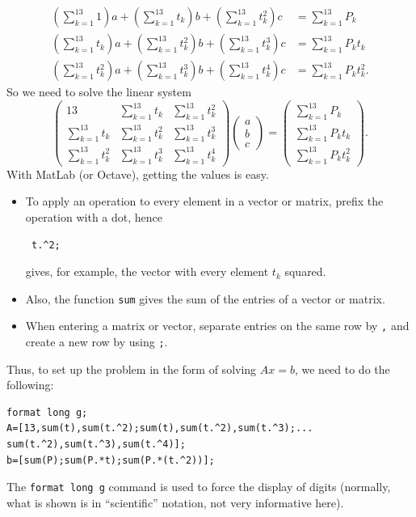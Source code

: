 \begin{align*}
\left(\sum_{k=1}^{13}1\right)a+\left(\sum_{k=1}^{13}t_k\right)b+\left(\sum_{k=1}^{13}t_k^2\right)c &= \sum_{k=1}^{13}P_k \\
\left(\sum_{k=1}^{13}t_k\right)a+\left(\sum_{k=1}^{13}t_k^2\right)b+\left(\sum_{k=1}^{13}t_k^3\right)c &= \sum_{k=1}^{13}P_kt_k \\
\left(\sum_{k=1}^{13}t_k^2\right)a+\left(\sum_{k=1}^{13}t_k^3\right)b+\left(\sum_{k=1}^{13}t_k^4\right)c &= \sum_{k=1}^{13}P_kt_k^2.
\end{align*}
So we need to solve the linear system
\[
\begin{pmatrix}
13 & \sum\limits_{k=1}^{13}t_k & \sum\limits_{k=1}^{13}t_k^2 \\
\sum\limits_{k=1}^{13}t_k & \sum\limits_{k=1}^{13}t_k^2 & \sum\limits_{k=1}^{13}t_k^3 \\
\sum\limits_{k=1}^{13}t_k^2 & \sum\limits_{k=1}^{13}t_k^3 & \sum\limits_{k=1}^{13}t_k^4
\end{pmatrix}
\begin{pmatrix}
a\\ b\\ c
\end{pmatrix}
=
\begin{pmatrix}
\sum\limits_{k=1}^{13}P_k \\
\sum\limits_{k=1}^{13}P_kt_k \\
\sum\limits_{k=1}^{13}P_kt_k^2
\end{pmatrix}.
\]
With MatLab (or Octave), getting the values is easy.
\begin{itemize}
\item To apply an operation to every element in a vector or matrix, prefix the operation with a dot, hence
\begin{verbatim}
 t.^2;
\end{verbatim}
gives, for example, the vector with every element $t_k$ squared. 
\item Also, the function {\tt sum} gives the sum of the entries of a vector or matrix.
\item When entering a matrix or vector, separate entries on the same row by {\tt ,} and create a new row by using {\tt ;}.
\end{itemize}
Thus, to set up the problem in the form of solving $Ax=b$, we need to do the
following:
\begin{verbatim}
format long g;
A=[13,sum(t),sum(t.^2);sum(t),sum(t.^2),sum(t.^3);...
sum(t.^2),sum(t.^3),sum(t.^4)];
b=[sum(P);sum(P.*t);sum(P.*(t.^2))];
\end{verbatim}
The {\tt format long g} command is used to force the display of digits (normally, what is shown is in ``scientific'' notation, not very informative here). 

